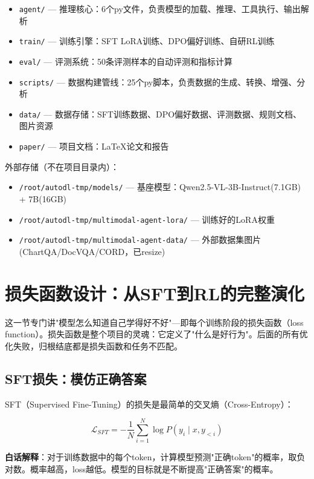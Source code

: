 \documentclass[fontset=none,11pt,a4paper]{ctexart}
\begin{document}
\begin{itemize}[nosep]
    \item \texttt{agent/} --- 推理核心：6个py文件，负责模型的加载、推理、工具执行、输出解析
    \item \texttt{train/} --- 训练引擎：SFT LoRA训练、DPO偏好训练、自研RL训练
    \item \texttt{eval/} --- 评测系统：50条评测样本的自动评测和指标计算
    \item \texttt{scripts/} --- 数据构建管线：25个py脚本，负责数据的生成、转换、增强、分析
    \item \texttt{data/} --- 数据存储：SFT训练数据、DPO偏好数据、评测数据、规则文档、图片资源
    \item \texttt{paper/} --- 项目文档：LaTeX论文和报告
\end{itemize}

外部存储（不在项目目录内）：
\begin{itemize}[nosep]
    \item \texttt{/root/autodl-tmp/models/} --- 基座模型：Qwen2.5-VL-3B-Instruct(7.1GB) + 7B(16GB)
    \item \texttt{/root/autodl-tmp/multimodal-agent-lora/} --- 训练好的LoRA权重
    \item \texttt{/root/autodl-tmp/multimodal-agent-data/} --- 外部数据集图片(ChartQA/DocVQA/CORD，已resize)
\end{itemize}

\newpage

\section{损失函数设计：从SFT到RL的完整演化}

这一节专门讲"模型怎么知道自己学得好不好"---即每个训练阶段的损失函数（loss function）。损失函数是整个项目的灵魂：它定义了"什么是好行为"。后面的所有优化失败，归根结底都是损失函数和任务不匹配。

\subsection{SFT损失：模仿正确答案}

SFT（Supervised Fine-Tuning）的损失是最简单的交叉熵（Cross-Entropy）：

\[
\mathcal{L}_{SFT} = -\frac{1}{N}\sum_{i=1}^{N} \log P(y_i \mid x, y_{<i})
\]

\textbf{白话解释}：对于训练数据中的每个token，计算模型预测"正确token"的概率，取负对数。概率越高，loss越低。模型的目标就是不断提高"正确答案"的概率。
\end{document}
